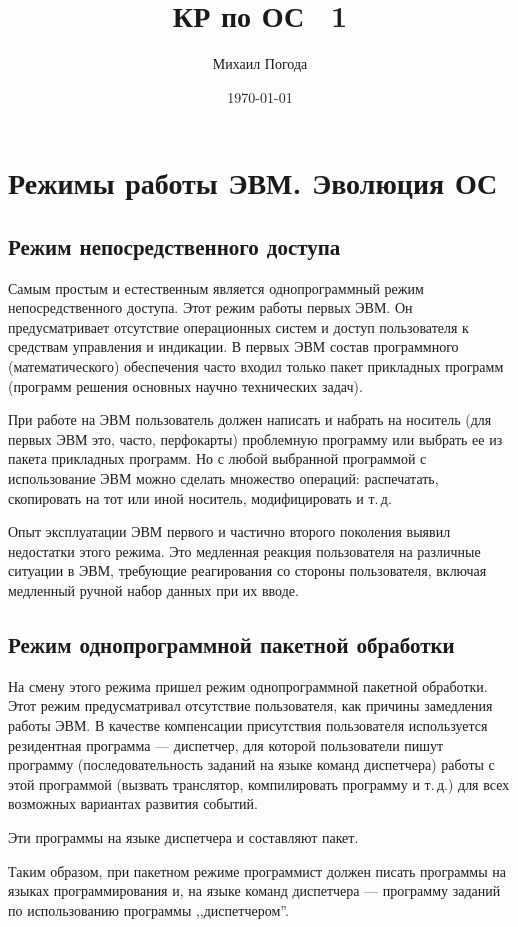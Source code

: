 \documentclass[a4paper, 10pt, notitlepage, pdftex,headsepline]{scrartcl}
\author{Михаил Погода}
\title{КР по ОС \textnumero~1}
\date{\today}
\begin{document}
\section{Режимы работы ЭВМ. Эволюция ОС}
  \subsection{Режим непосредственного доступа}
    Самым простым и естественным является однопрограммный режим непосредственного доступа.
    Этот режим работы первых ЭВМ.
    Он предусматривает отсутствие операционных систем и доступ
    пользователя к средствам управления и индикации.
    В первых ЭВМ состав программного (математического) обеспечения часто
    входил только пакет прикладных программ (программ решения основных
    научно технических задач).

    При работе на ЭВМ пользователь должен написать и набрать на носитель
    (для первых ЭВМ это, часто, перфокарты) проблемную программу или
    выбрать ее из пакета прикладных программ.
    Но с любой выбранной программой с использование ЭВМ можно сделать
    множество операций: распечатать, скопировать на тот или иной
    носитель, модифицировать и т.\,д.

    Опыт эксплуатации ЭВМ первого и частично второго поколения выявил
    недостатки этого режима.
    Это медленная реакция пользователя на различные ситуации в ЭВМ,
    требующие реагирования со стороны пользователя, включая медленный
    ручной набор данных при их вводе.
  \subsection{Режим однопрограммной пакетной обработки}
    На смену этого режима пришел режим однопрограммной пакетной обработки.
    Этот режим предусматривал отсутствие пользователя, как причины замедления работы ЭВМ.
    В качестве компенсации присутствия пользователя используется
    резидентная программа --- диспетчер, для которой пользователи пишут
    программу (последовательность заданий на языке команд диспетчера)
    работы с этой программой (вызвать транслятор, компилировать
    программу и т.\,д.) для всех возможных вариантах развития событий.

    Эти программы на языке диспетчера и составляют пакет.

    Таким образом, при пакетном режиме программист должен писать
    программы на языках программирования и, на языке команд диспетчера ---
    программу заданий по использованию программы ,,диспетчером''.
\end{document}
